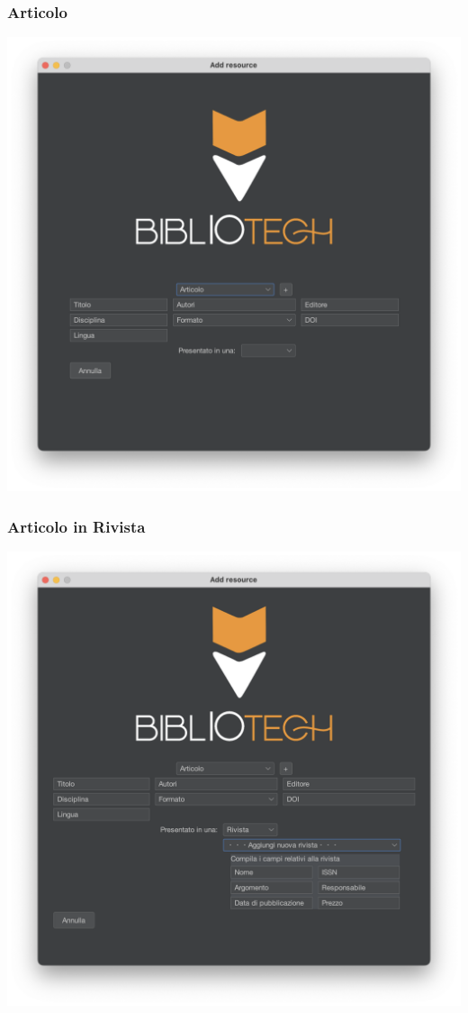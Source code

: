 \subsubsection{Articolo}
\includegraphics[scale=0.25]{Immagini/Schermate/Insert/InserisciRisorsaPage-Articolo.png}
\subsubsection{Articolo in Rivista}
\includegraphics[scale=0.25]{Immagini/Schermate/Insert/InserisciRisorsaPage-ArticoloRivista.png}
